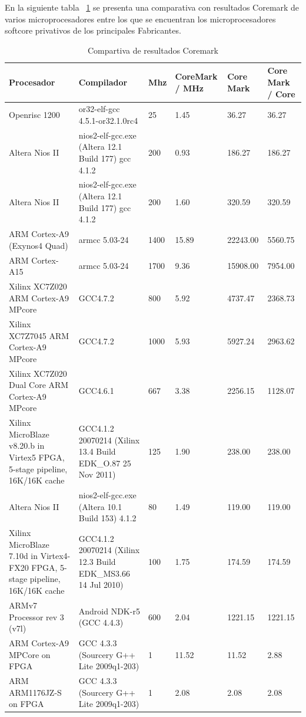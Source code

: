 En la siguiente tabla ~\ref{tab:compcoremark} se presenta una comparativa con resultados Coremark de varios microprocesadores entre los que se
encuentran los microprocesadores softcore privativos de los principales Fabricantes.

\begin{table}[h!]
\begin{center}
\begin{tabular}{ |p{4cm} |p{4cm}|p{0.8cm}|p{1.5cm}|p{2.1cm}|p{2.2cm}|}
\hline
\rowcolor[gray]{0.8} Procesador &	Compilador &	 Mhz &	CoreMark / MHz &	Core Mark &	 Core Mark / Core \\
\hline
	Openrisc 1200 & or32-elf-gcc 4.5.1-or32.1.0rc4							&25		&1.45   &36.27		&36.27 \\
\hline
	Altera Nios II & nios2-elf-gcc.exe (Altera 12.1 Build 177) gcc 4.1.2	&200	&0.93 	&186.27 	&186.27\\
\hline
	Altera Nios II & nios2-elf-gcc.exe (Altera 12.1 Build 177) gcc 4.1.2	&200	&1.60 	&320.59 	&320.59\\
\hline
	ARM Cortex-A9  (Exynos4 Quad) &	armcc 5.03-24							&1400	&15.89 	&22243.00 	&5560.75\\
\hline
	ARM Cortex-A15 &	armcc 5.03-24											&1700	&9.36 	&15908.00 	&7954.00\\
\hline
	Xilinx XC7Z020 ARM Cortex-A9 MPcore &	GCC4.7.2							&800	&5.92 	&4737.47 	&2368.73\\
\hline
	Xilinx XC7Z7045 ARM Cortex-A9 MPcore&	GCC4.7.2						&1000	&5.93 	&5927.24 	&2963.62\\
\hline
	Xilinx XC7Z020 Dual Core ARM Cortex-A9 MPcore&	GCC4.6.1				&667	&3.38 	&2256.15 	&1128.07\\
\hline
	Xilinx MicroBlaze v8.20.b in Virtex5 FPGA, 5-stage pipeline, 16K/16K cache &	GCC4.1.2 20070214 (Xilinx 13.4 Build EDK\_O.87 25 Nov 2011)	
																			&125	&1.90   &238.00 	&238.00 \\
\hline
	Altera Nios II &	nios2-elf-gcc.exe (Altera 10.1 Build 153) 4.1.2			&80		&1.49 	&119.00		&119.00\\
\hline
	Xilinx MicroBlaze 7.10d in Virtex4-FX20 FPGA, 5-stage pipeline, 16K/16K cache&	GCC4.1.2 20070214 (Xilinx 12.3 Build EDK\_MS3.66 14 Jul 2010)	
																			&100	&1.75	&174.59 	&174.59\\
\hline
	ARMv7 Processor rev 3 (v7l) &	Android NDK-r5 (GCC 4.4.3)					&600	&2.04 	&1221.15	&1221.15\\ 
\hline
	ARM Cortex-A9 MPCore on FPGA &	GCC 4.3.3 (Sourcery G++ Lite 2009q1-203)		&1		&11.52 	&11.52 		&2.88 	 	\\
\hline
	ARM ARM1176JZ-S	on FPGA & GCC 4.3.3 (Sourcery G++ Lite 2009q1-203)				&1		&2.08 	&2.08 		&2.08		\\
\hline
\end{tabular}
\end{center}
\caption{Compartiva de resultados Coremark}
\label{tab:compcoremark}
\end{table}


